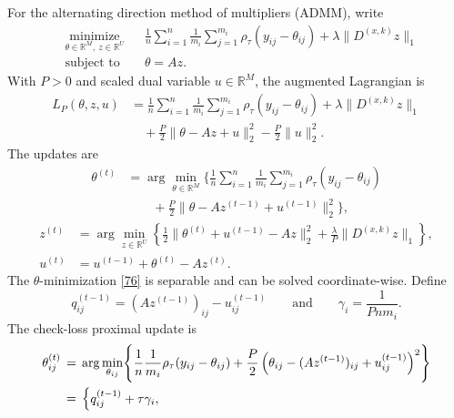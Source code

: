 \documentclass[twoside,11pt]{article}
\newenvironment{revision}{\color{revisionred}}{}
\begin{document}
\begin{revision}
For the alternating direction method of multipliers (ADMM), write
\begin{equation}
\label{74}
\begin{aligned}
&\underset{\theta\in\mathbb R^M,\ z\in\mathbb R^U}{\operatorname{minimize}}
&&\frac{1}{n}\sum_{i=1}^n\frac{1}{m_i}\sum_{j=1}^{m_i}
\rho_\tau(y_{ij}-\theta_{ij})+\lambda\|D^{(x,k)}z\|_1\\
&\text{subject to}&&\theta=Az.
\end{aligned}
\end{equation}
With \(P>0\) and scaled dual variable \(u\in\mathbb R^M\), the
augmented Lagrangian is
\begin{equation}
\label{75}
\begin{aligned}
L_P(\theta,z,u)
&=\frac{1}{n}\sum_{i=1}^n\frac{1}{m_i}\sum_{j=1}^{m_i}
\rho_\tau(y_{ij}-\theta_{ij})+\lambda\|D^{(x,k)}z\|_1\\
&\quad+\frac{P}{2}\|\theta-Az+u\|_2^2-\frac{P}{2}\|u\|_2^2.
\end{aligned}
\end{equation}
The updates are
\begin{equation}
\label{76}
\begin{aligned}
\theta^{(t)}
&=\arg\min_{\theta\in\mathbb R^M}
\biggl\{
\frac{1}{n}\sum_{i=1}^n\frac{1}{m_i}\sum_{j=1}^{m_i}
\rho_\tau(y_{ij}-\theta_{ij})\\
&\qquad+\frac{P}{2}\|\theta-Az^{(t-1)}+u^{(t-1)}\|_2^2
\biggr\},
\end{aligned}
\end{equation}
\begin{align}
\label{77}
z^{(t)}
&=\arg\min_{z\in\mathbb R^U}
\left\{
\frac{1}{2}\|\theta^{(t)}+u^{(t-1)}-Az\|_2^2
+\frac{\lambda}{P}\|D^{(x,k)}z\|_1
\right\},\\
\label{eq:tf_dual_update}
u^{(t)}&=u^{(t-1)}+\theta^{(t)}-Az^{(t)}.
\end{align}
The $\theta$-minimization \eqref{76} is separable and can be solved coordinate-wise. Define
\[
q_{ij}^{(t-1)}=(Az^{(t-1)})_{ij}-u_{ij}^{(t-1)}
\qquad\text{and}\qquad
\gamma_i=\frac{1}{Pnm_i}.
\]
The check-loss proximal update is
\begin{align}
\theta_{ij}^{(t)} &\,=\, \arg\min_{\theta_{ij}} \Biggl\{ \frac{1}{n} \frac{1}{m_i}\rho_{\tau} (y_{ij} - \theta_{ij}) + \frac{P}{2} \left( \theta_{ij} - (Az^{(t-1)})_{ij} + u_{ij}^{(t-1)} \right)^2 \Biggr\} \notag\\
\label{78}
&\,=\, 
\begin{cases}
    q_{ij}^{(t-1)}+\tau\gamma_i,

\end{cases}
\end{align}
\end{revision}
\end{document}
